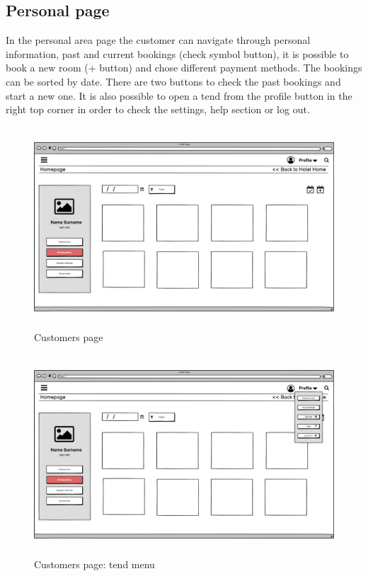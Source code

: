 \subsection{Personal page}
In the personal area page the customer can navigate through personal information, past and current bookings (check symbol button), it is possible to book a new room (+ button) and chose different payment methods. The bookings can be sorted by date. There are two buttons to check the past bookings and start a new one. It is also possible to open a tend from the profile button in the right top corner in order to check the settings, help section or log out.

\begin{figure}[H]
	\centering
	\includegraphics[height=7.5cm]{images/personal_1.png} 
	\caption{Customers page}
\end{figure}
\begin{figure}[H]
	\centering
	\includegraphics[height=7.5cm]{images/personal_2.png} 
	\caption{Customers page: tend menu}
\end{figure}